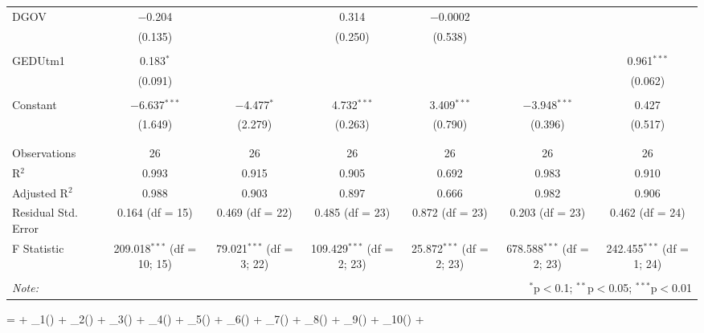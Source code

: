 \documentclass[8pt]{extarticle}
\begin{document}
\begin{landscape}
\begin{table}[!htbp]
\begin{tabular}{@{\extracolsep{5pt}}lcccccc}
 DGOV & $-$0.204 &  & 0.314 & $-$0.0002 &  &  \\ 
  & (0.135) &  & (0.250) & (0.538) &  &  \\ 
  & & & & & & \\ 
 GEDUtm1 & 0.183$^{*}$ &  &  &  &  & 0.961$^{***}$ \\ 
  & (0.091) &  &  &  &  & (0.062) \\ 
  & & & & & & \\ 
 Constant & $-$6.637$^{***}$ & $-$4.477$^{*}$ & 4.732$^{***}$ & 3.409$^{***}$ & $-$3.948$^{***}$ & 0.427 \\ 
  & (1.649) & (2.279) & (0.263) & (0.790) & (0.396) & (0.517) \\ 
  & & & & & & \\ 
\hline \\[-1.8ex] 
Observations & 26 & 26 & 26 & 26 & 26 & 26 \\ 
R$^{2}$ & 0.993 & 0.915 & 0.905 & 0.692 & 0.983 & 0.910 \\ 
Adjusted R$^{2}$ & 0.988 & 0.903 & 0.897 & 0.666 & 0.982 & 0.906 \\ 
Residual Std. Error & 0.164 (df = 15) & 0.469 (df = 22) & 0.485 (df = 23) & 0.872 (df = 23) & 0.203 (df = 23) & 0.462 (df = 24) \\ 
F Statistic & 209.018$^{***}$ (df = 10; 15) & 79.021$^{***}$ (df = 3; 22) & 109.429$^{***}$ (df = 2; 23) & 25.872$^{***}$ (df = 2; 23) & 678.588$^{***}$ (df = 2; 23) & 242.455$^{***}$ (df = 1; 24) \\ 
\hline 
\hline \\[-1.8ex] 
\textit{Note:}  & \multicolumn{6}{r}{$^{*}$p$<$0.1; $^{**}$p$<$0.05; $^{***}$p$<$0.01} \\ 
\end{tabular} 
\end{table} 



\end{landscape}

 = \alpha + \beta_{1}() + \beta_{2}() + \beta_{3}() + \beta_{4}() + \beta_{5}() + \beta_{6}() + \beta_{7}() + \beta_{8}() + \beta_{9}() + \beta_{10}() + \epsilon

\cleardoublepage
%


\end{document}
